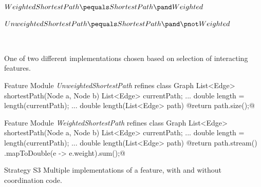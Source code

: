 \begin{frame}[fragile]{\myframetitle}
	\begin{fancycolumns}[widths={55},animation=none]
		{\centering\small

		$WeightedShortestPath \pequals ShortestPath \pand Weighted$

		$UnweightedShortestPath \pequals ShortestPath \pand \pnot Weighted$

		}~
		\begin{note}{}
			One of two different implementations chosen based on selection of interacting features.
		\end{note}
	\nextcolumn
\vspace{-10pt}
\begin{codetight}{Feature Module \emph{UnweightedShortestPath}}
	refines class Graph {
		List<Edge> shortestPath(Node a, Node b){
			List<Edge> currentPath;	...
			double length = length(currentPath);	... 
		}
		double length(List<Edge> path) {
			@return path.size();@
		}
	}
\end{codetight}	
\begin{codetight}{Feature Module \emph{WeightedShortestPath}}
	refines class Graph {
		List<Edge> shortestPath(Node a, Node b){
			List<Edge> currentPath;	... 
			double length = length(currentPath);	... 
		}
		double length(List<Edge> path) {
			@return path.stream()
					.mapToDouble(e -> e.weight).sum();@
		}
	}
\end{codetight}	


	\end{fancycolumns}
\end{frame}

\begin{frame}{\myframetitle}
	\begin{fancycolumns}[widths={30},animation=none]
		\begin{definition}{Strategy S3}
			Multiple implementations of a feature, with and without coordination code.
		\end{definition}
		\nextcolumn
	\end{fancycolumns}
\end{frame}



